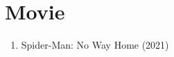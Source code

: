 \documentclass{article}
\numberwithin{equation}{section}
\begin{document}

\section{Movie}
\begin{enumerate}
	\item Spider-Man: No Way Home (2021)
\end{enumerate}

\end{document}
